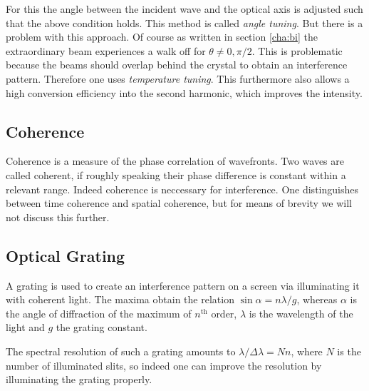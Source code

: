 \documentclass{protokoll_en}
\begin{document}
For this the angle between the incident wave and the optical axis is adjusted such that the above condition holds. This method is called \emph{angle tuning}. But there is a problem with this approach. Of course as written in section \ref{cha:bi} the extraordinary beam experiences a walk off for $\theta \neq 0, \pi/2$. This is problematic because the beams should overlap behind the crystal to obtain an interference pattern. Therefore one uses \emph{temperature tuning}. This furthermore also allows a high conversion efficiency into the second harmonic, which improves the intensity.


\subsection{Coherence}
Coherence is a measure of the phase correlation of wavefronts. Two waves are called coherent, if roughly speaking their phase difference is constant within a relevant range. Indeed coherence is neccessary for interference. One distinguishes between time coherence and spatial coherence, but for means of brevity we will not discuss this further.

\subsection{Optical Grating}
A grating is used to create an interference pattern on a screen via illuminating it with coherent light. The maxima obtain the relation $\sin{\alpha} = n \lambda/g$, whereas $\alpha$ is the angle of diffraction of the maximum of $n^{\mathrm{th}}$ order, $\lambda$ is the wavelength of the light and $g$ the grating constant.

The spectral resolution of such a grating amounts to $\lambda/\Delta\lambda = N n$, where $N$ is the number of illuminated slits, so indeed one can improve the resolution by illuminating the grating properly.
\end{document}
